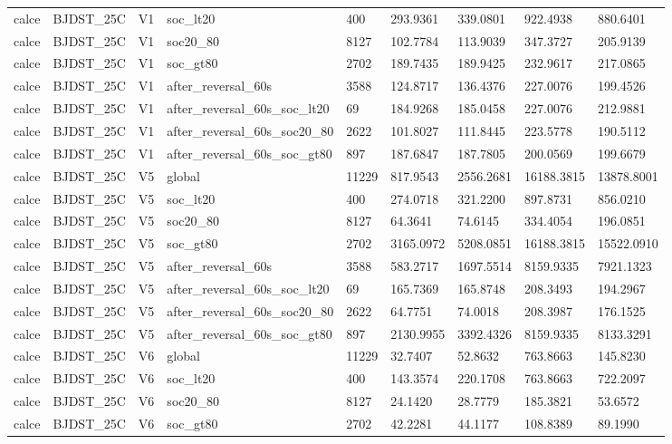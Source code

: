 \begin{tabular}{lllllllll}
calce & BJDST\_25C & V1 & soc\_lt20 & 400 & 293.9361 & 339.0801 & 922.4938 & 880.6401 \\
calce & BJDST\_25C & V1 & soc20\_80 & 8127 & 102.7784 & 113.9039 & 347.3727 & 205.9139 \\
calce & BJDST\_25C & V1 & soc\_gt80 & 2702 & 189.7435 & 189.9425 & 232.9617 & 217.0865 \\
calce & BJDST\_25C & V1 & after\_reversal\_60s & 3588 & 124.8717 & 136.4376 & 227.0076 & 199.4526 \\
calce & BJDST\_25C & V1 & after\_reversal\_60s\_soc\_lt20 & 69 & 184.9268 & 185.0458 & 227.0076 & 212.9881 \\
calce & BJDST\_25C & V1 & after\_reversal\_60s\_soc20\_80 & 2622 & 101.8027 & 111.8445 & 223.5778 & 190.5112 \\
calce & BJDST\_25C & V1 & after\_reversal\_60s\_soc\_gt80 & 897 & 187.6847 & 187.7805 & 200.0569 & 199.6679 \\
calce & BJDST\_25C & V5 & global & 11229 & 817.9543 & 2556.2681 & 16188.3815 & 13878.8001 \\
calce & BJDST\_25C & V5 & soc\_lt20 & 400 & 274.0718 & 321.2200 & 897.8731 & 856.0210 \\
calce & BJDST\_25C & V5 & soc20\_80 & 8127 & 64.3641 & 74.6145 & 334.4054 & 196.0851 \\
calce & BJDST\_25C & V5 & soc\_gt80 & 2702 & 3165.0972 & 5208.0851 & 16188.3815 & 15522.0910 \\
calce & BJDST\_25C & V5 & after\_reversal\_60s & 3588 & 583.2717 & 1697.5514 & 8159.9335 & 7921.1323 \\
calce & BJDST\_25C & V5 & after\_reversal\_60s\_soc\_lt20 & 69 & 165.7369 & 165.8748 & 208.3493 & 194.2967 \\
calce & BJDST\_25C & V5 & after\_reversal\_60s\_soc20\_80 & 2622 & 64.7751 & 74.0018 & 208.3987 & 176.1525 \\
calce & BJDST\_25C & V5 & after\_reversal\_60s\_soc\_gt80 & 897 & 2130.9955 & 3392.4326 & 8159.9335 & 8133.3291 \\
calce & BJDST\_25C & V6 & global & 11229 & 32.7407 & 52.8632 & 763.8663 & 145.8230 \\
calce & BJDST\_25C & V6 & soc\_lt20 & 400 & 143.3574 & 220.1708 & 763.8663 & 722.2097 \\
calce & BJDST\_25C & V6 & soc20\_80 & 8127 & 24.1420 & 28.7779 & 185.3821 & 53.6572 \\
calce & BJDST\_25C & V6 & soc\_gt80 & 2702 & 42.2281 & 44.1177 & 108.8389 & 89.1990 \\

\end{tabular}
